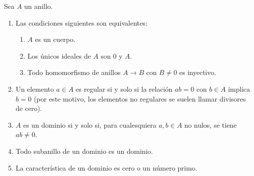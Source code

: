 \begin{proposition}{}{}
Sea \(A\) un anillo.
\begin{enumerate}
\item Las condiciones siguientes son equivalentes:

\begin{enumerate}
    \item \(A\) es un cuerpo.
    \item Los únicos ideales de \(A\) son \(0\) y \(A\).
    \item Todo homomorfismo de anillos \(A \to B\) con \(B \neq 0\) es inyectivo.
\end{enumerate}

\item Un elemento \(a \in A\) es regular si y solo si la relación \(ab = 0\) con \(b \in A\) implica \(b = 0\) (por este motivo, los elementos no regulares se suelen llamar divisores de cero).

\item \(A\) es un dominio si y solo si, para cualesquiera \(a, b \in A\) no nulos, se tiene \(ab \neq 0\).

\item Todo subanillo de un dominio es un dominio.

\item La característica de un dominio es cero o un número primo.
\end{enumerate}
\end{proposition}


